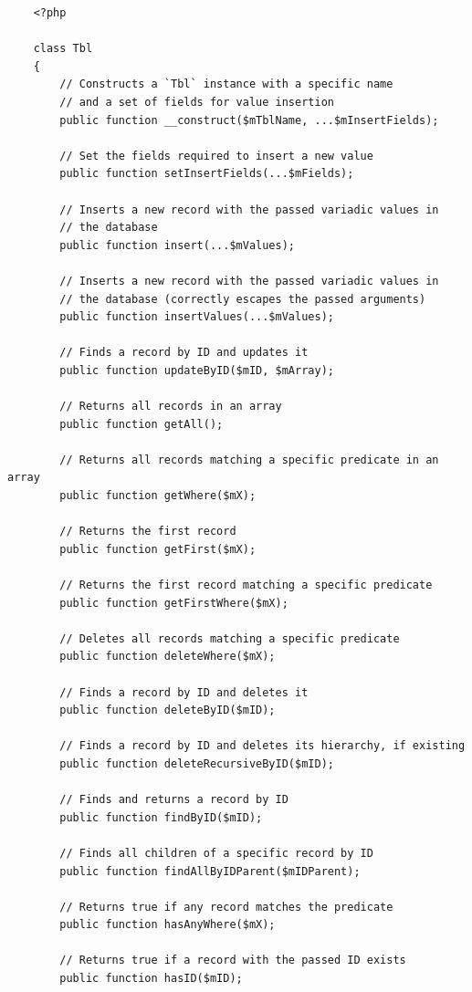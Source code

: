 \documentclass[12pt]{report}
\begin{document}
                    \begin{verbatim}
    <?php

    class Tbl
    {
        // Constructs a `Tbl` instance with a specific name
        // and a set of fields for value insertion
        public function __construct($mTblName, ...$mInsertFields);

        // Set the fields required to insert a new value
        public function setInsertFields(...$mFields);

        // Inserts a new record with the passed variadic values in
        // the database
        public function insert(...$mValues);

        // Inserts a new record with the passed variadic values in
        // the database (correctly escapes the passed arguments)
        public function insertValues(...$mValues);

        // Finds a record by ID and updates it
        public function updateByID($mID, $mArray);

        // Returns all records in an array
        public function getAll();

        // Returns all records matching a specific predicate in an array
        public function getWhere($mX);

        // Returns the first record
        public function getFirst($mX);

        // Returns the first record matching a specific predicate
        public function getFirstWhere($mX);

        // Deletes all records matching a specific predicate
        public function deleteWhere($mX);

        // Finds a record by ID and deletes it
        public function deleteByID($mID);

        // Finds a record by ID and deletes its hierarchy, if existing
        public function deleteRecursiveByID($mID);
        
        // Finds and returns a record by ID
        public function findByID($mID);

        // Finds all children of a specific record by ID
        public function findAllByIDParent($mIDParent);

        // Returns true if any record matches the predicate
        public function hasAnyWhere($mX);

        // Returns true if a record with the passed ID exists
        public function hasID($mID);


\end{verbatim}
\end{document}
